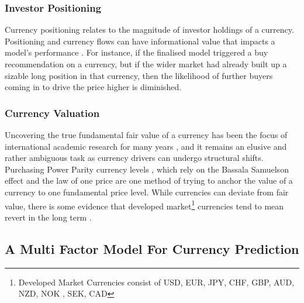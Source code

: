 \documentclass[11pt]{article}
\begin{document}
\subsubsection{Investor Positioning}
Currency positioning relates to the magnitude of investor holdings of a currency. Positioning and currency flows can have informational value that impacts a model's performance \cite{Menkhoff2012}. For instance, if the finalised model triggered a buy recommendation on a currency, but if the wider market had already built up a sizable long position in that currency, then the likelihood of further buyers coming in to drive the price higher is diminished.
\subsubsection{Currency Valuation}
Uncovering the true fundamental fair value of a currency has been the focus of international academic research for many years \cite{Rogoff1996}, and it remains an elusive and rather ambiguous task as currency drivers can undergo structural shifts. Purchasing Power Parity currency levels  , which rely on the Bassala Samuelson effect and the law of one price \cite{Hassan2016} are one method of trying to anchor the value of a currency to one fundamental price level. While currencies can deviate from fair value, there is some evidence that developed market\footnote{Developed Market Currencies consist of USD, EUR, JPY, CHF, GBP, AUD, NZD, NOK , SEK, CAD} currencies tend to mean revert in the long term \cite{CaZorzi2016}.


\subsection{A Multi Factor Model For Currency Prediction}
\end{document}
